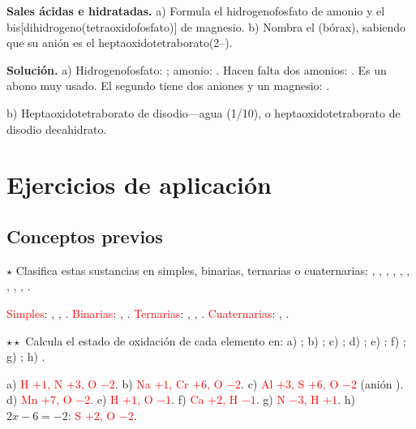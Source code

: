 \begin{example}
    \textbf{Sales ácidas e hidratadas.} a) Formula el hidrogenofosfato de amonio y el bis[dihidrogeno(tetraoxidofosfato)] de
    magnesio. b) Nombra el  (bórax), sabiendo que su anión es el heptaoxidotetraborato(2\nobreakdash--).

    \textbf{Solución.} a) Hidrogenofosfato: ; amonio: . Hacen falta dos amonios: . Es un
    abono muy usado. El segundo tiene dos aniones  y un magnesio: .

    b) Heptaoxidotetraborato de disodio---agua (1/10), o heptaoxidotetraborato de disodio decahidrato.
\end{example}

\section{Ejercicios de aplicación}\label{sec:ud5-aplicacion}

\subsection{Conceptos previos}

\begin{exercise}
    \(\star\) Clasifica estas sustancias en simples, binarias, ternarias o cuaternarias: , , , ,
    , , , , , .
    \begin{solu}
        \textcolor{red}{Simples}: , , . \textcolor{red}{Binarias}: , .
        \textcolor{red}{Ternarias}: , , . \textcolor{red}{Cuaternarias}: , .
    \end{solu}
\end{exercise}

\begin{exercise}
    \(\star\star\) Calcula el estado de oxidación de cada elemento en: a) ; b) ; c) ; d)
    ; e) ; f) ; g) ; h) .
    \begin{solu}
        a) \textcolor{red}{H \(+1\), N \(+3\), O \(-2\)}. b) \textcolor{red}{Na \(+1\), Cr \(+6\), O \(-2\)}. c)
        \textcolor{red}{Al \(+3\), S \(+6\), O \(-2\)} (anión ). d) \textcolor{red}{Mn \(+7\), O \(-2\)}. e)
        \textcolor{red}{H \(+1\), O \(-1\)}. f) \textcolor{red}{Ca \(+2\), H \(-1\)}. g) \textcolor{red}{N \(-3\), H \(+1\)}.
        h) \(2x - 6 = -2\): \textcolor{red}{S \(+2\), O \(-2\)}.
    \end{solu}
\end{exercise}

